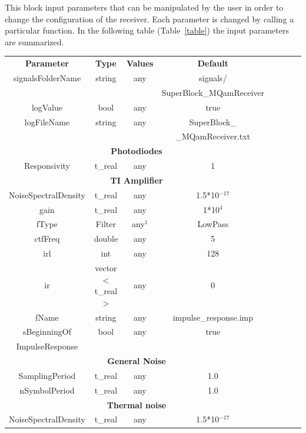 This block input parameters that can be manipulated by the user in
order to change the configuration of the receiver. Each parameter is changed by
calling a
particular function. In the following table
(Table~\ref{table}) the input parameters are
summarized.
%
\begin{table}[H]
	\begin{tabular}{|c|c|c|c|cccc}
		\cline{1-4}
		\textbf{Parameter} & \textbf{Type} & \textbf{Values} &   \textbf{Default}& \\ \cline{1-4}
        signalsFolderName & string & any & signals/\\
        & & & SuperBlock\_MQamReceiver \\ \cline{1-4}
        logValue & bool & any & true \\ \cline{1-4}
        logFileName & string & any & SuperBlock\_\\
        & & & \_MQamReceiver.txt \\ \cline{1-4}
		\multicolumn{4}{|c|}{ \textbf{Photodiodes} } \\ \cline{1-4}
		Responsivity & t\_real & any & 1\\ \cline{1-4}
		\multicolumn{4}{|c|}{ \textbf{TI Amplifier} } \\ \cline{1-4}
		NoiseSpectralDensity & t\_real & any & 1.5*10$^{-17}$ \\ \cline{1-4}
        gain & t\_real & any & 1*10$^4$ \\ \cline{1-4}
        fType & Filter & any$^1$ & LowPass \\ \cline{1-4}
        ctfFreq & double & any & 5 \\ \cline{1-4}
        irl & int & any & 128 \\ \cline{1-4}
        ir & vector$<$t\_real$>$ & any & 0 \\ \cline{1-4}
        fName & string & any & impulse\_response.imp \\ \cline{1-4}
        sBeginningOf & bool & any & true \\
        ImpulseResponse & & & \\ \cline{1-4}
		\multicolumn{4}{|c|}{ \textbf{General Noise} } \\ \cline{1-4}
		SamplingPeriod & t\_real & any & 1.0 \\ \cline{1-4}
        nSymbolPeriod   & t\_real & any & 1.0 \\ \cline{1-4}
        \multicolumn{4}{|c|}{ \textbf{Thermal noise} } \\ \cline{1-4}
        NoiseSpectralDensity & t\_real & any & 1.5*10$^{-17}$ \\ \cline{1-4}

\end{tabular}
\end{table}
